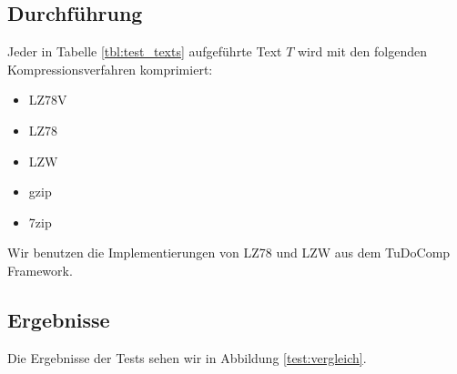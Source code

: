 \documentclass[a4paper,11pt]{scrartcl}%
\theoremstyle{change}
\theoremstyle{nonumberplain}
\theoremstyle{change}
\theoremstyle{nonumberplain}
\theoremstyle{change}
\theoremstyle{nonumberplain}
\begin{document}
\subsection{Durchführung}\label{vergleich_durch}

Jeder in Tabelle \ref{tbl:test_texts} aufgeführte Text $T$ wird mit den folgenden Kompressionsverfahren komprimiert:

\begin{itemize}
	\item LZ78V
	\item LZ78
	\item LZW
	\item gzip\cite{gzip}
	\item 7zip\cite{7zip}
\end{itemize}

Wir benutzen die Implementierungen von LZ78 und LZW aus dem TuDoComp Framework.

\subsection{Ergebnisse}\label{vergleichResult}

Die Ergebnisse der Tests sehen wir in Abbildung \ref{test:vergleich}.
\end{document}
